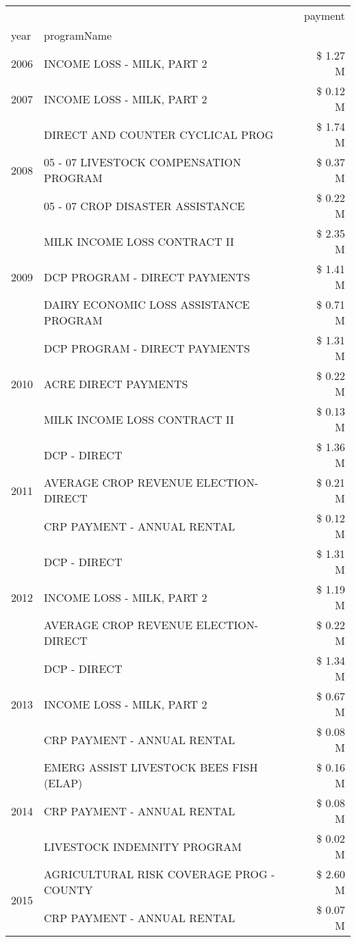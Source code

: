 \begin{tabular}{llr}
\toprule
 &  & payment \\
year & programName &  \\
\midrule
2006 & INCOME LOSS - MILK, PART 2 & \$ 1.27 M \\
\cline{1-3}
2007 & INCOME LOSS - MILK, PART 2 & \$ 0.12 M \\
\cline{1-3}
\multirow[t]{3}{*}{2008} & DIRECT AND COUNTER CYCLICAL PROG & \$ 1.74 M \\
 & 05 - 07 LIVESTOCK COMPENSATION PROGRAM & \$ 0.37 M \\
 & 05 - 07 CROP DISASTER ASSISTANCE & \$ 0.22 M \\
\cline{1-3}
\multirow[t]{3}{*}{2009} & MILK INCOME LOSS CONTRACT II & \$ 2.35 M \\
 & DCP PROGRAM - DIRECT PAYMENTS & \$ 1.41 M \\
 & DAIRY ECONOMIC LOSS ASSISTANCE PROGRAM & \$ 0.71 M \\
\cline{1-3}
\multirow[t]{3}{*}{2010} & DCP PROGRAM - DIRECT PAYMENTS & \$ 1.31 M \\
 & ACRE DIRECT PAYMENTS & \$ 0.22 M \\
 & MILK INCOME LOSS CONTRACT II & \$ 0.13 M \\
\cline{1-3}
\multirow[t]{3}{*}{2011} & DCP - DIRECT & \$ 1.36 M \\
 & AVERAGE CROP REVENUE ELECTION-DIRECT & \$ 0.21 M \\
 & CRP PAYMENT - ANNUAL RENTAL & \$ 0.12 M \\
\cline{1-3}
\multirow[t]{3}{*}{2012} & DCP - DIRECT & \$ 1.31 M \\
 & INCOME LOSS - MILK, PART 2 & \$ 1.19 M \\
 & AVERAGE CROP REVENUE ELECTION-DIRECT & \$ 0.22 M \\
\cline{1-3}
\multirow[t]{3}{*}{2013} & DCP - DIRECT & \$ 1.34 M \\
 & INCOME LOSS - MILK, PART 2 & \$ 0.67 M \\
 & CRP PAYMENT - ANNUAL RENTAL & \$ 0.08 M \\
\cline{1-3}
\multirow[t]{3}{*}{2014} & EMERG ASSIST LIVESTOCK BEES FISH (ELAP) & \$ 0.16 M \\
 & CRP PAYMENT - ANNUAL RENTAL & \$ 0.08 M \\
 & LIVESTOCK INDEMNITY PROGRAM & \$ 0.02 M \\
\cline{1-3}
\multirow[t]{3}{*}{2015} & AGRICULTURAL RISK COVERAGE PROG - COUNTY & \$ 2.60 M \\
 & CRP PAYMENT - ANNUAL RENTAL & \$ 0.07 M \\

\end{tabular}
